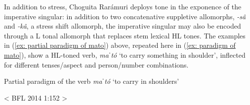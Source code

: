 In addition to stress, Choguita Rarámuri deploys tone in the exponence of the imperative singular: in addition to two concatenative suppletive allomorphs, \textit{{}-sâ} and \textit{{}-kâ}, a stress shift allomorph, the imperative singular may also be encoded through a L tonal allomorph that replaces stem lexical HL tones. The examples in (\ref{ex: partial paradigm of mato}) above, repeated here in (\ref{ex: paradigm of mato}), show a HL-toned verb, \textit{ma}ˈ\textit{tó} ‘to carry something in shoulder’, inflected for different tenses/aspect and person/number combinations.


\ea\label{ex: paradigm of mato}
{Partial paradigm of the verb \textit{maˈtó} ‘to carry in shoulders’}

{< BFL 2014 1:152 >}
    \z
\z


